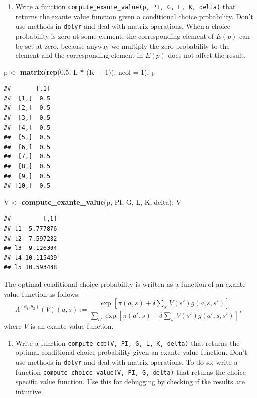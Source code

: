\documentclass[]{book}
\newenvironment{Shaded}{\begin{snugshade}}{\end{snugshade}}
\newcommand{\KeywordTok}[1]{\textcolor[rgb]{0.13,0.29,0.53}{\textbf{#1}}}
\newcommand{\DataTypeTok}[1]{\textcolor[rgb]{0.13,0.29,0.53}{#1}}
\newcommand{\DecValTok}[1]{\textcolor[rgb]{0.00,0.00,0.81}{#1}}
\newcommand{\FloatTok}[1]{\textcolor[rgb]{0.00,0.00,0.81}{#1}}
\newcommand{\StringTok}[1]{\textcolor[rgb]{0.31,0.60,0.02}{#1}}
\newcommand{\OperatorTok}[1]{\textcolor[rgb]{0.81,0.36,0.00}{\textbf{#1}}}
\newcommand{\NormalTok}[1]{#1}
\providecommand{\tightlist}{%
  \setlength{\itemsep}{0pt}\setlength{\parskip}{0pt}}
\begin{document}
\begin{enumerate}
\def\labelenumi{\arabic{enumi}.}
\setcounter{enumi}{2}
\tightlist
\item
  Write a function
  \texttt{compute\_exante\_value(p,\ PI,\ G,\ L,\ K,\ delta)} that
  returns the exante value function given a conditional choice
  probability. Don't use methods in \texttt{dplyr} and deal with matrix
  operations. When a choice probability is zero at some element, the
  corresponding element of \(E(p)\) can be set at zero, because anyway
  we multiply the zero probability to the element and the corresponding
  element in \(E(p)\) does not affect the result.
\end{enumerate}

\begin{Shaded}
\begin{Highlighting}[]
\NormalTok{p <-}\StringTok{ }\KeywordTok{matrix}\NormalTok{(}\KeywordTok{rep}\NormalTok{(}\FloatTok{0.5}\NormalTok{, L }\OperatorTok{*}\StringTok{ }\NormalTok{(K }\OperatorTok{+}\StringTok{ }\DecValTok{1}\NormalTok{)), }\DataTypeTok{ncol =} \DecValTok{1}\NormalTok{); p}
\end{Highlighting}
\end{Shaded}

\begin{verbatim}
##       [,1]
##  [1,]  0.5
##  [2,]  0.5
##  [3,]  0.5
##  [4,]  0.5
##  [5,]  0.5
##  [6,]  0.5
##  [7,]  0.5
##  [8,]  0.5
##  [9,]  0.5
## [10,]  0.5
\end{verbatim}

\begin{Shaded}
\begin{Highlighting}[]
\NormalTok{V <-}\StringTok{ }\KeywordTok{compute_exante_value}\NormalTok{(p, PI, G, L, K, delta); V}
\end{Highlighting}
\end{Shaded}

\begin{verbatim}
##         [,1]
## l1  5.777876
## l2  7.597282
## l3  9.126304
## l4 10.115439
## l5 10.593438
\end{verbatim}

The optimal conditional choice probability is written as a function of
an exante value function as follows: \[
\Lambda^{(\theta_1, \theta_2)}(V)(a, s) := \frac{\exp[\pi(a, s) + \delta \sum_{s'}V(s')g(a, s, s')]}{\sum_{a'}\exp[\pi(a', s) + \delta \sum_{s'}V(s')g(a', s, s')]},
\] where \(V\) is an exante value function.

\begin{enumerate}
\def\labelenumi{\arabic{enumi}.}
\setcounter{enumi}{3}
\tightlist
\item
  Write a function \texttt{compute\_ccp(V,\ PI,\ G,\ L,\ K,\ delta)}
  that returns the optimal conditional choice probability given an
  exante value function. Don't use methods in \texttt{dplyr} and deal
  with matrix operations. To do so, write a function
  \texttt{compute\_choice\_value(V,\ PI,\ G,\ delta)} that returns the
  choice-specific value function. Use this for debugging by checking if
  the results are intuitive.
\end{enumerate}
\end{document}
